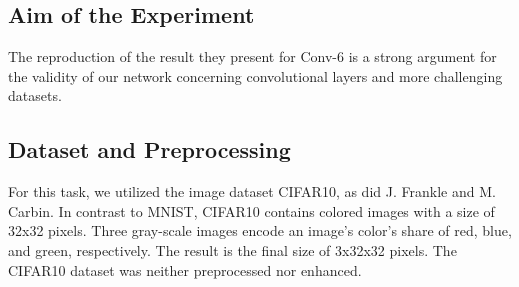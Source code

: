 \subsection*{Aim of the Experiment}
The reproduction of the result they present for Conv-6 is a strong argument for the validity of our network concerning convolutional layers and more challenging datasets. 

\subsection*{Dataset and Preprocessing}
For this task, we utilized the image dataset CIFAR10, as did J. Frankle and M. Carbin. In contrast to MNIST, CIFAR10 contains colored images with a size of 32x32 pixels. Three gray-scale images encode an image's color's share of red, blue, and green, respectively. The result is the final size of 3x32x32 pixels.
The CIFAR10 dataset was neither preprocessed nor enhanced.

